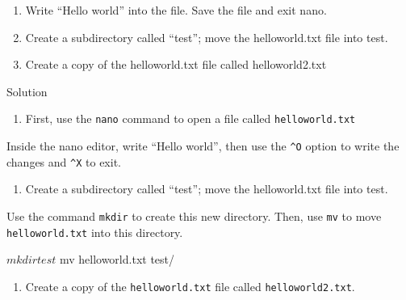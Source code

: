 \documentclass[
]{book}
\newenvironment{Shaded}{\begin{snugshade}}{\end{snugshade}}
\newcommand{\ExtensionTok}[1]{#1}
\newcommand{\NormalTok}[1]{#1}
\providecommand{\tightlist}{%
  \setlength{\itemsep}{0pt}\setlength{\parskip}{0pt}}
\begin{document}
\begin{enumerate}
\def\labelenumi{\arabic{enumi}.}
\tightlist
\item
  Write ``Hello world'' into the file. Save the file and exit nano.
\item
  Create a subdirectory called ``test''; move the helloworld.txt file into test.
\item
  Create a copy of the helloworld.txt file called helloworld2.txt
\end{enumerate}

Solution

\begin{enumerate}
\def\labelenumi{\arabic{enumi}.}
\tightlist
\item
  First, use the \texttt{nano} command to open a file called \texttt{helloworld.txt}
\end{enumerate}

\begin{Shaded}
\end{Shaded}

Inside the nano editor, write ``Hello world'', then use the \texttt{\^{}O} option to write the changes and \texttt{\^{}X} to exit.

\begin{enumerate}
\def\labelenumi{\arabic{enumi}.}
\setcounter{enumi}{1}
\tightlist
\item
  Create a subdirectory called ``test''; move the helloworld.txt file into test.
\end{enumerate}

Use the command \texttt{mkdir} to create this new directory. Then, use \texttt{mv} to move \texttt{helloworld.txt} into this directory.

\begin{Shaded}
\begin{Highlighting}[]
\ExtensionTok{$}\NormalTok{ mkdir test}
\ExtensionTok{$}\NormalTok{ mv helloworld.txt test/}
\end{Highlighting}
\end{Shaded}

\begin{enumerate}
\def\labelenumi{\arabic{enumi}.}
\setcounter{enumi}{2}
\tightlist
\item
  Create a copy of the \texttt{helloworld.txt} file called \texttt{helloworld2.txt}.
\end{enumerate}
\end{document}
